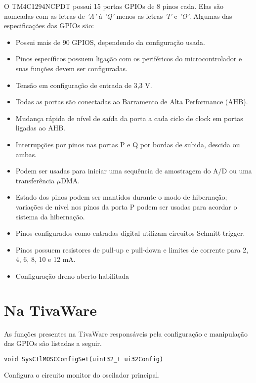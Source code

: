 O TM4C1294NCPDT possui 15 portas GPIOs de 8 pinos cada. Elas são nomeadas com as letras de \emph{'A'} à \emph{'Q'} menos as letras \emph{'I'} e \emph{'O'}. Algumas das especificações das GPIOs são:

\begin{itemize}
	\item Possui mais de 90 GPIOS, dependendo da configuração usada.
	\item Pinos específicos possuem ligação com os periféricos do microcontrolador e suas funções devem ser configuradas.
	\item Tensão em configuração de entrada de 3,3 V.
	\item Todas as portas são conectadas ao Barramento de Alta Performance (AHB).
	\item Mudança rápida de nível de saída da porta a cada ciclo de clock em portas ligadas ao AHB.
	\item Interrupções por pinos nas portas P e Q por bordas de subida, descida ou ambas.
	\item Podem ser usadas para iniciar uma sequência de amostragem do A/D ou uma transferência $\mu$DMA.
	\item Estado dos pinos podem ser mantidos durante o modo de hibernação; variações de nível nos pinos da porta P podem ser usadas para acordar o sistema da hibernação.
	\item Pinos configurados como entradas digital utilizam circuitos Schmitt-trigger.
	\item Pinos possuem resistores de pull-up e pull-down e limites de corrente para 2, 4, 6, 8, 10 e 12 mA.
	\item Configuração dreno-aberto habilitada
\end{itemize}

\section{Na TivaWare}

As funções presentes na TivaWare responsáveis pela configuração e manipulação das GPIOs são listadas a seguir.

\begin{lstlisting}[style=funcao]
	void SysCtlMOSCConfigSet(uint32_t ui32Config)
\end{lstlisting}

Configura o circuito monitor do oscilador principal.

